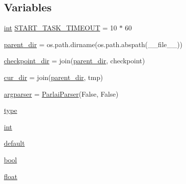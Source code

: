 \subsection*{Variables}
\begin{DoxyCompactItemize}
\item 
\hyperlink{namespacemastering__the__dungeon_1_1mturk_1_1tasks_1_1MTD_1_1run_a6084d3d0aa204086fb98a0842ba617c9}{int} \hyperlink{namespacemastering__the__dungeon_1_1mturk_1_1tasks_1_1MTD_1_1run_ad67c4a961aa04ffc9ef217c4208c6749}{S\+T\+A\+R\+T\+\_\+\+T\+A\+S\+K\+\_\+\+T\+I\+M\+E\+O\+UT} = 10 $\ast$ 60
\item 
\hyperlink{namespacemastering__the__dungeon_1_1mturk_1_1tasks_1_1MTD_1_1run_a62814e664479088e15eb0878309f936c}{parent\+\_\+dir} = os.\+path.\+dirname(os.\+path.\+abspath(\+\_\+\+\_\+file\+\_\+\+\_\+))
\item 
\hyperlink{namespacemastering__the__dungeon_1_1mturk_1_1tasks_1_1MTD_1_1run_a7f5e4574d5ce8f2a7c8b21a56654dd7c}{checkpoint\+\_\+dir} = join(\hyperlink{namespacemastering__the__dungeon_1_1mturk_1_1tasks_1_1MTD_1_1run_a62814e664479088e15eb0878309f936c}{parent\+\_\+dir}, \textquotesingle{}checkpoint\textquotesingle{})
\item 
\hyperlink{namespacemastering__the__dungeon_1_1mturk_1_1tasks_1_1MTD_1_1run_ad640ef3f7a29d7cc14b07239f84a894e}{cur\+\_\+dir} = join(\hyperlink{namespacemastering__the__dungeon_1_1mturk_1_1tasks_1_1MTD_1_1run_a62814e664479088e15eb0878309f936c}{parent\+\_\+dir}, \textquotesingle{}tmp\textquotesingle{})
\item 
\hyperlink{namespacemastering__the__dungeon_1_1mturk_1_1tasks_1_1MTD_1_1run_a446f750657d132281a4246e51ea779c6}{argparser} = \hyperlink{classparlai_1_1core_1_1params_1_1ParlaiParser}{Parlai\+Parser}(False, False)
\item 
\hyperlink{namespacemastering__the__dungeon_1_1mturk_1_1tasks_1_1MTD_1_1run_a326e35d6ecea6effec1e26e8cd1211c2}{type}
\item 
\hyperlink{namespacemastering__the__dungeon_1_1mturk_1_1tasks_1_1MTD_1_1run_a6084d3d0aa204086fb98a0842ba617c9}{int}
\item 
\hyperlink{namespacemastering__the__dungeon_1_1mturk_1_1tasks_1_1MTD_1_1run_a6c11c3d361d59e56bb2b44ccfd0d332c}{default}
\item 
\hyperlink{namespacemastering__the__dungeon_1_1mturk_1_1tasks_1_1MTD_1_1run_a5874b4e14c972df7d3591659bc2ba0ca}{bool}
\item 
\hyperlink{namespacemastering__the__dungeon_1_1mturk_1_1tasks_1_1MTD_1_1run_a2335f7d1785b471814927c7a3a565b6e}{float}

\end{DoxyCompactItemize}
